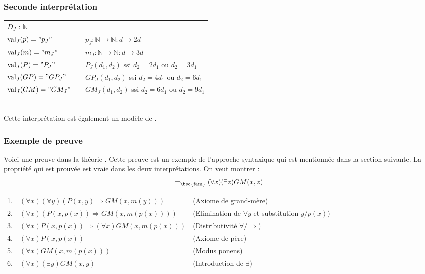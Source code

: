 {\subsubsection{Seconde interprétation}

\begin{tabular}{lll}
$D_J$ : $\mathbb{N}$&&\\
$\text{val}_J(p)="p_J"$ &\hspace*{1cm} &$p_J : \mathbb{N}\rightarrow\mathbb{N} : d \rightarrow 2d$\\
$\text{val}_J(m)="m_J"$ &\hspace*{1cm} &$m_J : \mathbb{N}\rightarrow\mathbb{N} : d \rightarrow 3d$\\
$\text{val}_J(P)="P_J"$ &\hspace*{1cm} &$P_J(d_1,d_2)$ ssi $d_2=2d_1$ ou $d_2=3d_1$\\
$\text{val}_J(GP)="GP_J"$ &\hspace*{1cm} &$GP_J(d_1,d_2)$ ssi $d_2=4d_1$ ou $d_2=6d_1$\\
$\text{val}_J(GM)="GM_J"$ &\hspace*{1cm} &$GM_J(d_1,d_2)$ ssi $d_2=6d_1$ ou $d_2=9d_1$\\
\end{tabular}\\

Cette interprétation est également un modèle de .

\subsubsection{Exemple de preuve}

Voici une preuve dans la théorie .
Cette preuve est un exemple de l'approche syntaxique qui est mentionnée dans la section suivante.
La propriété qui est prouvée est vraie dans les deux interprétations.
On veut montrer  : 
$$\models_{\text{\bsc{fam}}} (\forall x)(\exists z) GM(x,z)$$

\begin{tabular}{lll}
1.&$(\forall x)(\forall y) \left(P(x,y)\Rightarrow GM(x, m(y)) \right)$&(Axiome de grand-mère)\\
2.&$(\forall x) \left(P(x,p(x))\Rightarrow GM(x, m(p(x))) \right)$&(Elimination de $\forall y$ et substitution $y/p(x)$)\\
3.&$(\forall x) P(x,p(x)) \Rightarrow (\forall x) GM(x,m(p(x)))$& (Distributivité $\forall/\Rightarrow$)\\
4.&$(\forall x) P(x,p(x))$ & (Axiome de père) \\
5.&$(\forall x) GM(x,m(p(x)))$&(Modus ponens)\\
6.&$(\forall x) (\exists y) GM(x,y)$&(Introduction de $\exists$)\\
\end{tabular}

}
